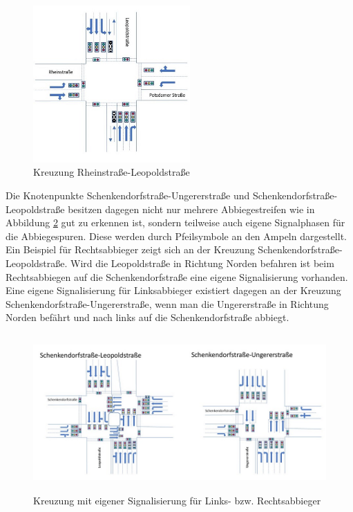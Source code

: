 \begin{savenotes}
	\begin{figure}[H]
		\centering
		\includegraphics[width=6cm,height=6cm]{figures/Rhein_Leo}
		\caption[Kreuzung Rheinstraße-Leopoldstraße]{Kreuzung Rheinstraße-Leopoldstraße \parencite[S. 28]{Kutsch.05.04.2018}}\label{fig:Rhein_Leo}
	\end{figure}
\end{savenotes}

Die Knotenpunkte Schenkendorfstraße-Ungererstraße und Schenkendorfstraße-Leopoldstraße besitzen dagegen nicht nur mehrere Abbiegestreifen wie in Abbildung \ref{fig:eigene_Signalisierung}
gut zu erkennen ist, sondern teilweise auch eigene Signalphasen für die Abbiegespuren. Diese werden durch Pfeilsymbole an den Ampeln dargestellt. Ein Beispiel für Rechtsabbieger zeigt sich an der Kreuzung Schenkendorfstraße-Leopoldstraße. Wird die Leopoldstraße in Richtung Norden befahren ist beim Rechtsabbiegen auf die Schenkendorfstraße eine eigene Signalisierung vorhanden. Eine eigene Signalisierung für Linksabbieger existiert dagegen an der Kreuzung Schenkendorfstraße-Ungererstraße, wenn man die Ungererstraße in Richtung Norden befährt und nach links auf die Schenkendorfstraße abbiegt.

\begin{savenotes}
	\begin{figure}[H]
		\centering
		\includegraphics[width=12cm,height=6cm]{figures/Kreuzungen_eigene_Abbiegephase}
		\caption[Kreuzungen mit eigener Signalisierung für Links- bzw. Rechtsabbieger]{Kreuzung mit eigener Signalisierung für Links- bzw. Rechtsabbieger \parencite[S. 30f]{Kutsch.05.04.2018}}\label{fig:eigene_Signalisierung}
	\end{figure}
\end{savenotes}


